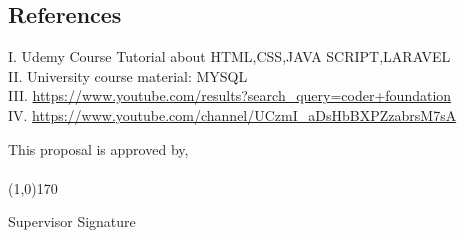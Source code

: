 \documentclass{article}
\begin{document}
\begin{titlepage}
\vspace{5cm}

\section{References}\label{oject}
I.	Udemy Course Tutorial about HTML,CSS,JAVA SCRIPT,LARAVEL \\
II.	University course material: MYSQL \\
III. \url{https://www.youtube.com/results?search_query=coder+foundation} \\
IV. \url{https://www.youtube.com/channel/UCzmI_aDsHbBXPZzabrsM7sA}

\vspace{8cm}
\label{oject}
This proposal is approved by,\\ \\


\hspace{300pt} \line(1,0){170}	

\hspace{325pt} Supervisor Signature\\



\end{titlepage}
\end{document}
